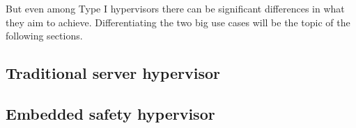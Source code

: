 But even among Type I hypervisors there can be significant differences in what they aim to achieve. Differentiating the two big use cases will be the topic of the following sections.
\subsection{Traditional server hypervisor}
\subsection{Embedded safety hypervisor}

